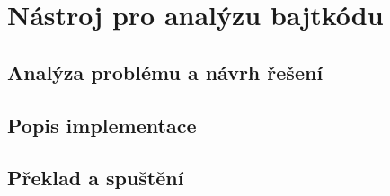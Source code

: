\chapter{Nástroj pro analýzu bajtkódu}

\section{Analýza problému a návrh řešení}


\section{Popis implementace}

\section{Překlad a spuštění}

